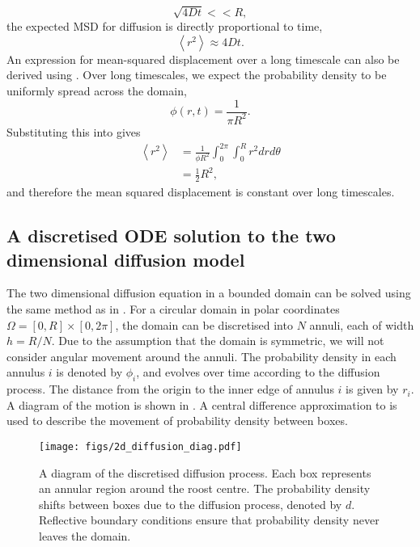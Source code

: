 %
\begin{equation}
\sqrt{4Dt} << R,
\end{equation}
%
the expected MSD for diffusion is directly proportional to time,
%
\begin{equation}
\left<r^2\right> \approx 4Dt.
\label{eqn:diffusion_short}
\end{equation}
%
An expression for mean-squared displacement over a long timescale can also be derived using . Over long timescales, we expect the probability density to be uniformly spread across the domain,
%
\begin{equation}
\phi(r,t) = \frac{1}{\pi R^2} .
\end{equation}
%
Substituting this into  gives
%
\begin{align}
\left<r^2\right> &= \frac{1}{\phi R^2}\int_{0}^{2\pi} \int_{0}^{R} r^2 dr d\theta \nonumber \\
&= \frac{1}{2} R^2,
\end{align}
%
and therefore the mean squared displacement is constant over long timescales.


\subsection{A discretised ODE solution to the two dimensional diffusion model}

The two dimensional diffusion equation in a bounded domain can be solved using the same method as in . For a circular domain in polar coordinates $\Omega = [0,R] \times [0, 2\pi]$, the domain can be discretised into $N$ annuli, each of
width $h=R/N$. Due to the assumption that the domain is symmetric, we will not consider angular movement around the annuli. The probability density in each annulus $i$ is denoted by $\phi_i$, and evolves over time according to the diffusion process.  The distance from the origin to the inner edge of annulus $i$ is given by $r_i$. A diagram of the motion is shown in . A central difference approximation to  is used to describe the movement of probability density between boxes.

\begin{figure}
\centering
    \texttt{[image: figs/2d\_diffusion\_diag.pdf]}
    \caption{A diagram of the discretised diffusion process. Each box represents an annular region around the roost centre. The probability density shifts between boxes due to the diffusion process, denoted by $d$. Reflective boundary conditions ensure that probability density never leaves the domain.}
\label{fig:2d_diffusion_diag}
\end{figure}


